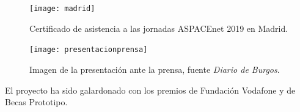 \begin{figure}
	\centering
	\texttt{[image: madrid]}
	\caption{Certificado de asistencia a las jornadas ASPACEnet 2019 en Madrid.}
	\label{fig:madrid}
\end{figure}

\begin{figure}
	\centering
	\texttt{[image: presentacionprensa]}
	\caption{Imagen de la presentación ante la prensa, fuente \textit{Diario de Burgos}.}
	\label{fig:presprensa}
\end{figure}

El proyecto ha sido galardonado con los premios de Fundación Vodafone y de Becas Prototipo.